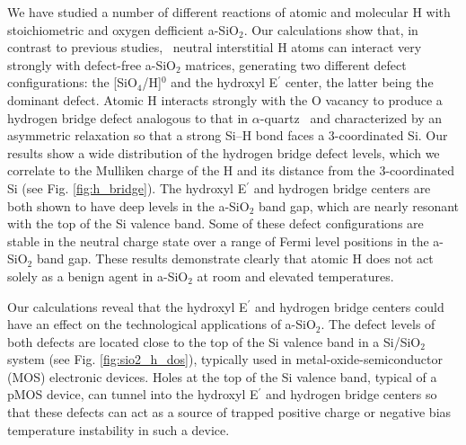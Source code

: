 \documentclass[aps,prb,reprint,superscriptaddress,showpacs]{revtex4-1}
\begin{document}
We have studied a number of different reactions of atomic and molecular H with stoichiometric and oxygen defficient a-SiO$_2$. Our calculations show that, in contrast to previous studies,~\cite{blochl_vacancies,robertson_oxides,godet_hydrogen} neutral interstitial H atoms can interact very strongly with defect-free a-SiO$_2$ matrices, generating two different defect configurations: the [SiO$_4$/H]$^0$ and the hydroxyl E$^\prime$ center, the latter being the dominant defect. Atomic H interacts strongly with the O vacancy to produce a hydrogen bridge defect analogous to that in $\alpha$-quartz~\cite{blochl_vacancies} and characterized by an asymmetric relaxation so that a strong \mbox{Si--H} bond faces a 3-coordinated Si. Our results show a wide distribution of the hydrogen bridge defect levels, which we correlate to the Mulliken charge of the H and its distance from the 3-coordinated Si (see Fig. \ref{fig:h_bridge}). The hydroxyl E$^\prime$ and hydrogen bridge centers are both shown to have deep levels in the a-SiO$_2$ band gap, which are nearly resonant with the top of the Si valence band. Some of these defect configurations are stable in the neutral charge state over a range of Fermi level positions in the a-SiO$_2$ band gap. These results demonstrate clearly that atomic H does not act solely as a benign agent in a-SiO$_2$ at room and elevated temperatures.

Our calculations reveal that the hydroxyl E$^\prime$ and hydrogen bridge centers could have an effect on the technological applications of a-SiO$_2$. The defect levels of both defects are located close to the top of the Si valence band in a Si/SiO$_2$ system (see Fig. \ref{fig:sio2_h_dos}), typically used in metal-oxide-semiconductor (MOS) electronic devices. Holes at the top of the Si valence band, typical of a pMOS device, can tunnel into the hydroxyl E$^\prime$ and hydrogen bridge centers so that these defects can act as a source of trapped positive charge or negative bias temperature instability in such a device.
\end{document}
